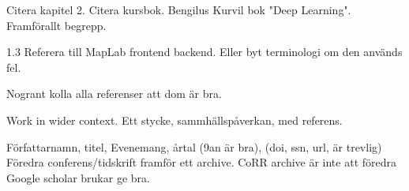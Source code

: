 

Citera kapitel 2. Citera kursbok. Bengilus Kurvil bok "Deep Learning".
Framförallt begrepp.

1.3 Referera till MapLab frontend backend. Eller byt terminologi om den används fel.

Nogrant kolla alla referenser att dom är bra.

Work in wider context. Ett stycke, sammhällspåverkan, med referens.

Författarnamn, titel, Evenemang, årtal (9an är bra), (doi, ssn, url, är trevlig)
Föredra conferens/tidskrift framför ett archive.
CoRR archive är inte att föredra
Google scholar brukar ge bra.





